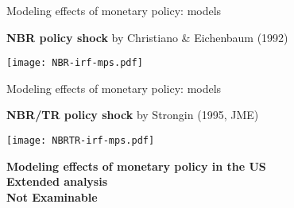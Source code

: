 \documentclass[notes,blackandwhite,mathsans,usenames,dvipsnames]{beamer}
\begin{document}
\begin{frame}{Modeling effects of monetary policy: {\color{purple}models}}

\textbf{NBR policy shock}
{\footnotesize \color{mcxs2}by Christiano \& Eichenbaum (1992)}

\centering
\texttt{[image: NBR-irf-mps.pdf]}

\end{frame}




\begin{frame}{Modeling effects of monetary policy: {\color{purple}models}}

\textbf{NBR/TR policy shock}
{\footnotesize \color{mcxs2}by Strongin (1995, JME)}

\centering
\texttt{[image: NBRTR-irf-mps.pdf]}

\end{frame}



{
\begin{frame}

\begin{center}
\vspace{1cm}\Large\textbf{\color{mcxs4}Modeling effects of monetary policy in the US}\\ \textbf{\color{mcxs2} Extended analysis}\\[3ex]
\textbf{\color{purple}Not Examinable}
\end{center}

\bigskip\footnotesize
{}\\ 
\\
\\

\smallskip{}\\ 
\\
\\
\\

\end{frame}
}
\end{document}
